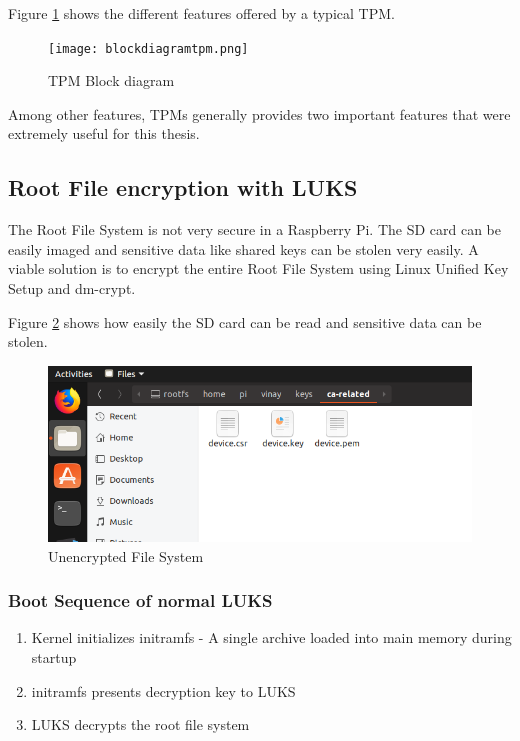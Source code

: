\documentclass[11pt,openright]{report}
\begin{document}
Figure \ref{fig:blockdiagramtpm} shows the different features offered by a typical TPM.
\begin{figure}
	\centering
	\texttt{[image: blockdiagramtpm.png]}
	\caption{TPM Block diagram}
	\label{fig:blockdiagramtpm}
\end{figure}

Among other features, TPMs generally provides two important features that were extremely useful for this thesis.
\subsection{Root File encryption with LUKS}
The Root File System is not very secure in a Raspberry Pi. The SD card can be easily imaged and sensitive data like shared keys can be stolen very easily. A viable solution is to encrypt the entire Root File System using Linux Unified Key Setup and dm-crypt.

Figure \ref{fig:normal_fs} shows how easily the SD card can be read and sensitive data can be stolen.
\begin{figure}
    \centering
    \includegraphics[scale=1]{images/3_NormalFS.png}
    \caption{Unencrypted File System}
    \label{fig:normal_fs}
\end{figure}

\subsubsection{Boot Sequence of normal LUKS}
\renewcommand{\theenumi}{\roman{enumi}}%
\begin{enumerate}
	\item Kernel initializes initramfs - A single archive loaded into main memory during startup
	\item initramfs presents decryption key to LUKS
	\item LUKS decrypts the root file system
\end{enumerate}
\end{document}
